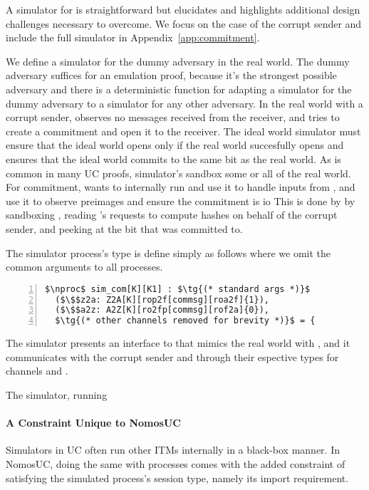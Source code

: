 A simulator for \protcom is straightforward but elucidates and highlights additional design challenges necessary to overcome.
We focus on the case of the corrupt sender and include the full simulator in Appendix~\ref{app:commitment}.

We define a simulator for the dummy adversary in the real world.
The dummy adversary suffices for an emulation proof, because it's the strongest possible adversary and there is a deterministic function for adapting a simulator for the dummy adversary to a simulator for any other adversary.
In the real world with a corrupt sender, \Z observes no messages received from the receiver, and tries to create a commitment and open it to the receiver.
The ideal world simulator \Sim must ensure that the ideal world opens only if the real world succesfully opens and ensures that the ideal world commits to the same bit as the real world.
As is common in many UC proofs, simulator's sandbox some or all of the real world.
For commitment, \Sim wants to internally run \Fro and use it to handle inputs from \Z, and use it to observe preimages and ensure the commitment is io
This is done by \Sim by sandboxing \Fro, reading \Z's requests to compute hashes on behalf of the corrupt sender, and peeking at the bit that was committed to.

The simulator process's type is define simply as follows where we omit the common arguments to all processes. 
\begin{lstlisting}[basicstyle=\scriptsize\BeraMonottFamily, mathescape, frame=single, numbers=left, xleftmargin=2em, xrightmargin=0em]
$\nproc$ sim_com[K][K1] : $\tg{(* standard args *)}$ 
  ($\$$z2a: Z2A[K][rop2f[commsg][roa2f]{1}), 
  ($\$$a2z: A2Z[K][ro2fp[commsg][rof2a]{0}),
  $\tg{(* other channels removed for brevity *)}$ = {
\end{lstlisting}
The simulator presents an interface to \Z that mimics the real world with \Fro, and it communicates with the corrupt sender and \Fcom through their espective types for channels  and .

The simulator, running 


\paragraph*{\textbf{A Constraint Unique to NomosUC}}
Simulators in UC often run other ITMs internally in a black-box manner. 
In NomosUC, doing the same with processes comes with the added constraint of satisfying the simulated process's session type, namely its import requirement.


